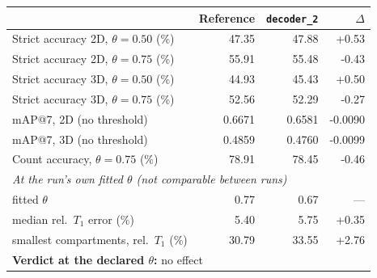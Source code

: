 \renewcommand{\arraystretch}{1.05}
\begin{tabular}{lrrr}
\toprule
 & Reference & \texttt{decoder\_2} & $\Delta$ \\
\midrule
Strict accuracy 2D, $\theta = 0.50$ (\%) & 47.35 & 47.88 & +0.53 \\
Strict accuracy 2D, $\theta = 0.75$ (\%) & 55.91 & 55.48 & -0.43 \\
Strict accuracy 3D, $\theta = 0.50$ (\%) & 44.93 & 45.43 & +0.50 \\
Strict accuracy 3D, $\theta = 0.75$ (\%) & 52.56 & 52.29 & -0.27 \\
\midrule
mAP@7, 2D (no threshold) & 0.6671 & 0.6581 & -0.0090 \\
mAP@7, 3D (no threshold) & 0.4859 & 0.4760 & -0.0099 \\
\midrule
Count accuracy, $\theta = 0.75$ (\%) & 78.91 & 78.45 & -0.46 \\
\midrule
\multicolumn{4}{l}{\emph{At the run's own fitted $\theta$ (not comparable between runs)}} \\
\quad fitted $\theta$ & 0.77 & 0.67 & --- \\
\quad median rel.\ $T_1$ error (\%) & 5.40 & 5.75 & +0.35 \\
\quad smallest compartments, rel.\ $T_1$ (\%) & 30.79 & 33.55 & +2.76 \\
\midrule
\multicolumn{4}{l}{\textbf{Verdict at the declared $\theta$:} no effect} \\
\bottomrule
\end{tabular}

